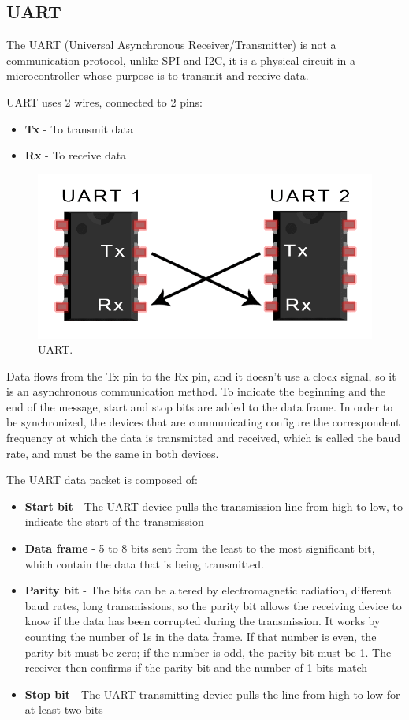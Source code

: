 \documentclass[english]{ist-thesis}
\begin{document}
\subsection{UART}

The UART (Universal Asynchronous Receiver/Transmitter) is not a communication protocol, unlike SPI and I2C, it is a physical circuit in a microcontroller whose purpose is to transmit and receive data. 

UART uses 2 wires, connected to 2 pins:

\begin{itemize}
    \item \textbf{Tx} - To transmit data
    \item \textbf{Rx} - To receive data
\end{itemize}

\begin{figure}[ht]
	\centering
	\includegraphics[width = 0.8\linewidth]{images/protocolos/uart.png}
	\caption{UART.}
	\label{fig:uart}
\end{figure}

Data flows from the Tx pin to the Rx pin, and it doesn't use a clock signal, so it is an asynchronous communication method. To indicate the beginning and the end of the message, start and stop bits are added to the data frame. In order to be synchronized, the devices that are communicating configure the correspondent frequency at which the data is transmitted and received, which is called the baud rate, and must be the same in both devices. 

The UART data packet is composed of:

\begin{itemize}
    \item \textbf{Start bit} - The UART device pulls the transmission line from high to low, to indicate the start of the transmission
    \item \textbf{Data frame} - 5 to 8 bits sent from the least to the most significant bit, which contain the data that is being transmitted.
    \item \textbf{Parity bit} -  The bits can be altered by electromagnetic radiation, different baud rates, long transmissions, so the parity bit allows the receiving device to know if the data has been corrupted during the transmission. It works by counting the number of 1s in the data frame. If that number is even, the parity bit must be zero; if the number is odd, the parity bit must be 1. The receiver then confirms if the parity bit and the number of 1 bits match
    \item \textbf{Stop bit} - The UART transmitting device pulls the line from high to low for at least two bits
\end{itemize}
\end{document}
